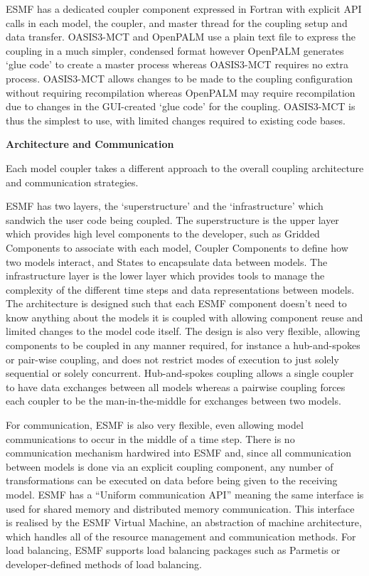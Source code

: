 ESMF has a dedicated coupler component expressed in Fortran with explicit API
calls in each model, the coupler, and master thread for the coupling setup and
data transfer. OASIS3-MCT and OpenPALM use a plain text file to express the
coupling in a much simpler, condensed format however OpenPALM generates `glue
code' to create a master process whereas OASIS3-MCT requires no extra process.
OASIS3-MCT allows changes to be made to the coupling configuration without
requiring recompilation whereas OpenPALM may require recompilation due to
changes in the GUI-created `glue code' for the coupling. OASIS3-MCT is thus the
simplest to use, with limited changes required to existing code bases.

\textbf{Architecture and Communication}

Each model coupler takes a different approach to the overall coupling
architecture and communication strategies.

ESMF has two layers, the `superstructure' and the `infrastructure' which
sandwich the user code being coupled. The superstructure is the upper layer
which provides high level components to the developer, such as Gridded
Components to associate with each model, Coupler Components to define how two
models interact, and States to encapsulate data between models. The
infrastructure layer is the lower layer which provides tools to manage the
complexity of the different time steps and data representations between models.
The architecture is designed such that each ESMF component doesn't need to know
anything about the models it is coupled with allowing component reuse and
limited changes to the model code itself. The design is also very flexible,
allowing components to be coupled in any manner required, for instance a
hub-and-spokes or pair-wise coupling, and does not restrict modes of execution
to just solely sequential or solely concurrent. Hub-and-spokes coupling allows a
single coupler to have data exchanges between all models whereas a pairwise
coupling forces each coupler to be the man-in-the-middle for exchanges between
two models.

For communication, ESMF is also very flexible, even allowing model
communications to occur in the middle of a time step. There is no communication
mechanism hardwired into ESMF and, since all communication between models is
done via an explicit coupling component, any number of transformations can be
executed on data before being given to the receiving model. ESMF has a ``Uniform
communication API'' \cite{ESMF2014} meaning the same interface is used for
shared memory and distributed memory communication. This interface is realised
by the ESMF Virtual Machine, an abstraction of machine architecture, which
handles all of the resource management and communication methods. For load
balancing, ESMF supports load balancing packages such as Parmetis
\cite{Hoefler2010,Karypis1998} or developer-defined methods of load balancing.

